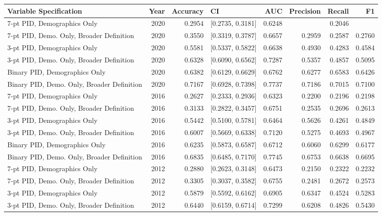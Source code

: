 \begin{longtable}{lrrlrrrr}
  \toprule
Variable Specification & Year & Accuracy & CI & AUC & Precision & Recall & F1 \\ 
  \midrule
7-pt PID, Demographics Only & 2020 & 0.2954 & [0.2735, 0.3181] & 0.6248 &  & 0.2046 &  \\ 
  7-pt PID, Demo. Only, Broader Definition & 2020 & 0.3550 & [0.3319, 0.3787] & 0.6657 & 0.2959 & 0.2587 & 0.2760 \\ 
  3-pt PID, Demographics Only & 2020 & 0.5581 & [0.5337, 0.5822] & 0.6638 & 0.4930 & 0.4283 & 0.4584 \\ 
  3-pt PID, Demo. Only, Broader Definition & 2020 & 0.6328 & [0.6090, 0.6562] & 0.7287 & 0.5357 & 0.4857 & 0.5095 \\ 
  Binary PID, Demographics Only & 2020 & 0.6382 & [0.6129, 0.6629] & 0.6762 & 0.6277 & 0.6583 & 0.6426 \\ 
  Binary PID, Demo. Only, Broader Definition & 2020 & 0.7167 & [0.6928, 0.7398] & 0.7737 & 0.7186 & 0.7015 & 0.7100 \\ 
  7-pt PID, Demographics Only & 2016 & 0.2627 & [0.2333, 0.2936] & 0.6323 & 0.2200 & 0.2196 & 0.2198 \\ 
  7-pt PID, Demo. Only, Broader Definition & 2016 & 0.3133 & [0.2822, 0.3457] & 0.6751 & 0.2535 & 0.2696 & 0.2613 \\ 
  3-pt PID, Demographics Only & 2016 & 0.5442 & [0.5100, 0.5781] & 0.6464 & 0.5626 & 0.4261 & 0.4849 \\ 
  3-pt PID, Demo. Only, Broader Definition & 2016 & 0.6007 & [0.5669, 0.6338] & 0.7120 & 0.5275 & 0.4693 & 0.4967 \\ 
  Binary PID, Demographics Only & 2016 & 0.6235 & [0.5873, 0.6587] & 0.6712 & 0.6060 & 0.6299 & 0.6177 \\ 
  Binary PID, Demo. Only, Broader Definition & 2016 & 0.6835 & [0.6485, 0.7170] & 0.7745 & 0.6753 & 0.6638 & 0.6695 \\ 
  7-pt PID, Demographics Only & 2012 & 0.2880 & [0.2623, 0.3148] & 0.6473 & 0.2150 & 0.2322 & 0.2232 \\ 
  7-pt PID, Demo. Only, Broader Definition & 2012 & 0.3305 & [0.3037, 0.3582] & 0.6755 & 0.2481 & 0.2672 & 0.2573 \\ 
  3-pt PID, Demographics Only & 2012 & 0.5879 & [0.5592, 0.6162] & 0.6905 & 0.6347 & 0.4524 & 0.5283 \\ 
  3-pt PID, Demo. Only, Broader Definition & 2012 & 0.6440 & [0.6159, 0.6714] & 0.7299 & 0.6208 & 0.4826 & 0.5430 \\ 

\end{longtable}
